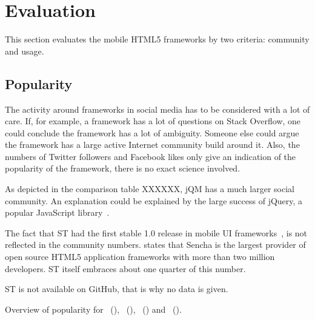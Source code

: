 \documentclass[a4paper]{artikel3}
\begin{document}
\section{Evaluation}
This section evaluates the mobile HTML5 frameworks by two criteria: community and usage.

\subsection{Popularity} %
\label{sec:evaluation-popularity}

The activity around frameworks in social media has to be considered with a lot of care.  
If,  for example,  a framework has a lot of questions on Stack Overflow,  one could conclude the framework has a lot of ambiguity.  
Someone else could argue  the framework has a large active Internet community build around it.  
Also,  the numbers of Twitter followers and Facebook likes only give an indication of the popularity of the framework,  there is no exact science involved.

As depicted in the comparison table XXXXXX,  jQM has a much larger social community.  
An explanation could be explained by the large success of jQuery,  a popular JavaScript library~\cite{Hales2012}.

The fact that ST had the first stable 1.0 release in mobile UI frameworks~\cite{Oeflman2011},  is not reflected in the community numbers.  
\cite{Inc.} states that Sencha is the largest provider of open source HTML5 application frameworks with more than two million developers.  
ST itself embraces about one quarter of this number.

ST is not available on GitHub,  that is why no data is given.

\begin{table}
\centering
\resizebox{8cm}{!} {
}
\caption{Overview of popularity for \st{}~(\sta), \kendo{}~(\kendoa), \jqm{}~(\jqma) and \lungo{}~(\lungoa).}
\label{tabel:evaluatie-popularity}
\end{table}
\end{document}
